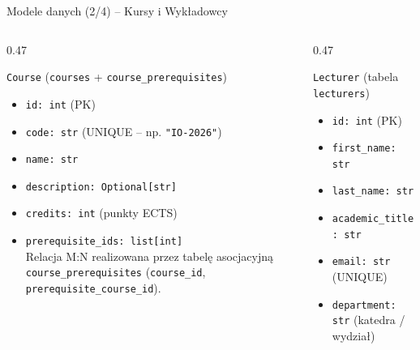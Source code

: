 \documentclass[aspectratio=169, 10pt, xcolor=table]{beamer}
\begin{document}
\begin{frame}{Modele danych (2/4) -- Kursy i Wykładowcy}
    \footnotesize
    \begin{columns}[T, onlytextwidth]
        \begin{column}{0.47\textwidth}
            \begin{block}{\texttt{Course} (\texttt{courses} + \texttt{course\_prerequisites})}
                \begin{itemize}
                    \item \texttt{id: int} (PK)
                    \item \texttt{code: str} (UNIQUE -- np. \texttt{"IO-2026"})
                    \item \texttt{name: str}
                    \item \texttt{description: Optional[str]}
                    \item \texttt{credits: int} (punkty ECTS)
                    \item \texttt{prerequisite\_ids: list[int]}\\
                    {\scriptsize Relacja M:N realizowana przez tabelę asocjacyjną \texttt{course\_prerequisites} (\texttt{course\_id}, \texttt{prerequisite\_course\_id}).}
                \end{itemize}
            \end{block}
        \end{column}
        \begin{column}{0.47\textwidth}
            \begin{exampleblock}{\texttt{Lecturer} (tabela \texttt{lecturers})}
                \begin{itemize}
                    \item \texttt{id: int} (PK)
                    \item \texttt{first\_name: str}
                    \item \texttt{last\_name: str}
                    \item \texttt{academic\_title: str}
                    \item \texttt{email: str} (UNIQUE)
                    \item \texttt{department: str} (katedra / wydział)
                \end{itemize}
            \end{exampleblock}
        \end{column}
    \end{columns}
\end{frame}
\end{document}
